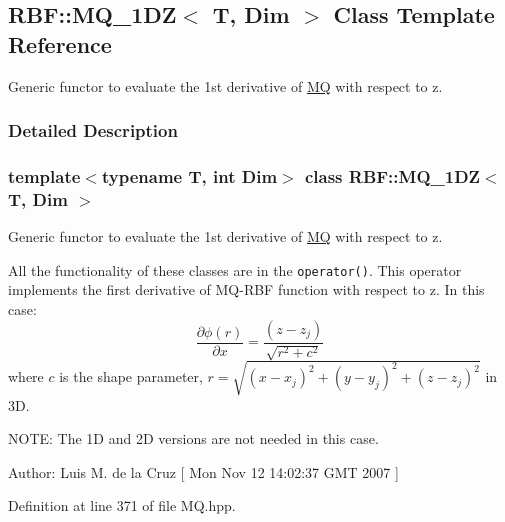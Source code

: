 \hypertarget{classRBF_1_1MQ__1DZ}{
\subsection{RBF::MQ\_\-1DZ$<$ T, Dim $>$ Class Template Reference}
\label{classRBF_1_1MQ__1DZ}
}
Generic functor to evaluate the 1st derivative of \hyperlink{classRBF_1_1MQ}{MQ} with respect to z.  




\subsubsection{Detailed Description}
\subsubsection*{template$<$typename T, int Dim$>$ class RBF::MQ\_\-1DZ$<$ T, Dim $>$}

Generic functor to evaluate the 1st derivative of \hyperlink{classRBF_1_1MQ}{MQ} with respect to z. 

All the functionality of these classes are in the {\tt operator()}. This operator implements the first derivative of MQ-RBF function with respect to z. In this case: \[ \frac{\partial \phi(r)}{\partial x} = \frac{(z-z_j)}{\sqrt{r^2+c^2}} \] where $ c $ is the shape parameter, $ r = \sqrt{(x - x_j)^2 + (y - y_j)^2 + (z - z_j)^2} $ in 3D. \begin{Desc}
\item[NOTE: The 1D and 2D versions are not needed in this case.]\end{Desc}
\begin{Desc}
\item[Author:]Luis M. de la Cruz \mbox{[} Mon Nov 12 14:02:37 GMT 2007 \mbox{]} \end{Desc}


Definition at line 371 of file MQ.hpp.